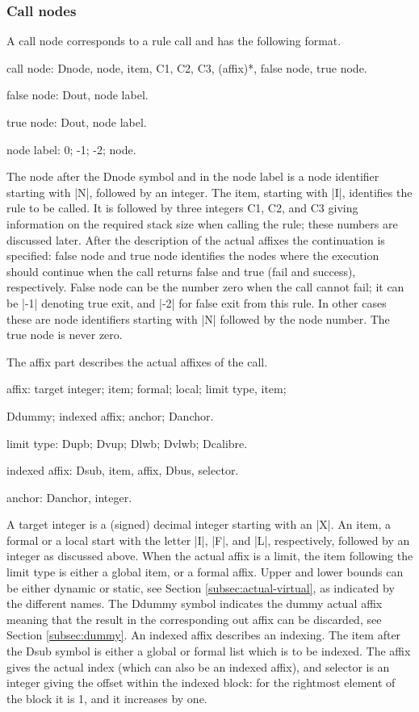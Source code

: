 \documentclass[titlepage]{article}
\newcommand\g[1]{\textsf{#1}}
\newenvironment{grammar}{%
\begin{list}{}{%
\setlength\leftmargin{18pt}%
\setlength\rightmargin{-5pt}%
\setlength\listparindent{20pt}%
\setlength\itemsep{1pt plus0.2ex}%
\setlength\parsep{0pt plus 2pt}%
\setlength\labelsep{-5pt}%
}\sf\mkoptions%
}{\end{list}}
\begin{document}
\subsubsection{Call nodes}
A call node  corresponds to a rule call and has the following format.
\begin{grammar}
\item call node: Dnode, node, item, C1, C2, C3, (affix)*, false node,
true node.
\item false node: Dout, node label.
\item true node: Dout, node label.
\item node label: 0; -1; -2; node.
\end{grammar}
\noindent
The \g{node} after the \g{Dnode} symbol and in the \g{node label} is a node 
identifier starting with \pp|N|, followed by an integer. The \g{item}, 
starting with \pp|I|, identifies the rule to be called. It is followed by
three integers \g{C1}, \g{C2}, and \g{C3} giving information on the required
stack size when calling the rule; these numbers are discussed later. After the 
description of the actual affixes the continuation is specified:
\g{false node} and \g{true node} identifies the nodes where the 
execution should continue when the call returns false and true (fail and
success), respectively. 
\g{False node} can be the number zero when the call cannot fail; it can be
\pp|-1| denoting true exit, and  \pp|-2| for false exit from this rule. 
In other cases these are node identifiers starting with \pp|N| followed by 
the node number. The \g{true node} is never zero.

The \g{affix} part describes the actual affixes of the call.
\begin{grammar}
\item affix: target integer; item; formal; local; limit type, item;

   Ddummy; indexed affix; anchor; Danchor.
\item limit type: Dupb; Dvup; Dlwb; Dvlwb; Dcalibre.
\item indexed affix: Dsub, item, affix, Dbus, selector.
\item anchor: Danchor, integer.
\end{grammar}
A \g{target integer} is a (signed) decimal integer starting with an \pp|X|.
An \g{item}, a \g{formal} or a \g{local} start with the letter \pp|I|,
\pp|F|, and \pp|L|, respectively, followed by an integer as discussed above.
When the actual affix is a limit, the \g{item} following the \g{limit type}
is either a global \g{item}, or a \g{formal} affix. Upper and lower bounds
can be either dynamic or static, see Section \ref{subsec:actual-virtual}, as
indicated by the different names.
The \g{Ddummy} symbol indicates the \g{dummy} actual affix meaning that the
result in the corresponding out affix can be discarded, see Section
\ref{subsec:dummy}. An \g{indexed affix} describes an indexing. The \g{item}
after the \g{Dsub} symbol is either a global or formal list which is to be
indexed. The \g{affix} gives the actual index (which can also be an indexed
affix), and \g{selector} is an integer giving the offset within the indexed
block: for the rightmost element of the block it is 1, and it increases by
one.
\end{document}
